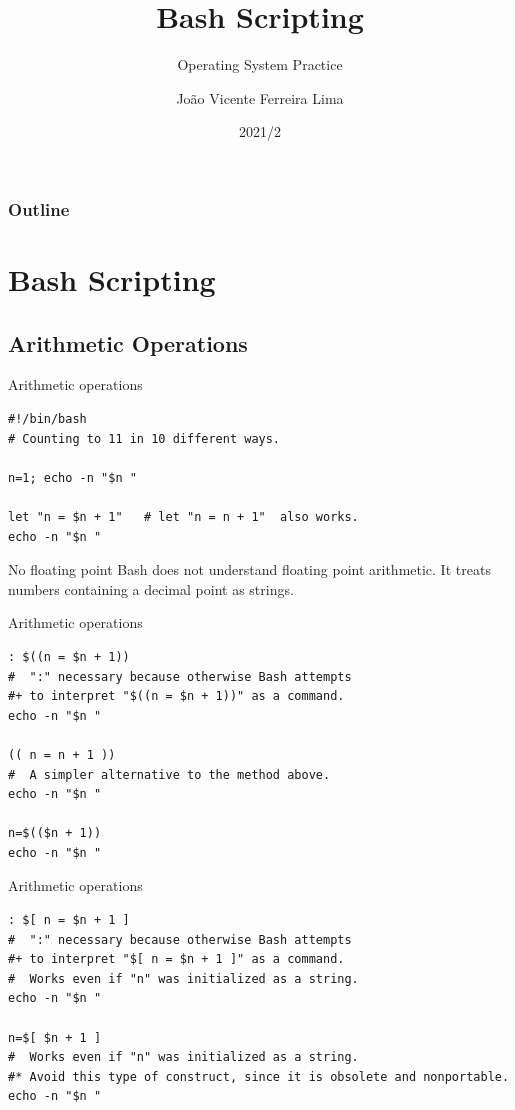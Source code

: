 \documentclass[xcolor=dvipsnames, 10pt, presentation,aspectratio=169]{beamer}
\author{João Vicente Ferreira Lima}
\date{2021/2}
\title{Bash Scripting}
\subtitle{Operating System Practice}
\institute[UFSM]{Universidade Federal de Santa Maria \\ \url{jvlima@inf.ufsm.br} \\ \url{http://www.inf.ufsm.br/~jvlima}}
\begin{document}
\maketitle
{}
{
  \frametitle{Outline}
  \tableofcontents
}

\makeatletter
{}
\makeatother

\section{Bash Scripting}
\label{sec:org39a313b}
\subsection{Arithmetic Operations}
\label{sec:org55f1e2f}
\begin{frame}[label={sec:org5d02e79},fragile]{Arithmetic operations}
 \begin{block}{}
\begin{verbatim}
#!/bin/bash
# Counting to 11 in 10 different ways.

n=1; echo -n "$n "

let "n = $n + 1"   # let "n = n + 1"  also works.
echo -n "$n "

\end{verbatim}
\end{block}
\pause
\begin{alertblock}{No floating point}
Bash does not understand floating point arithmetic. It treats numbers
containing a decimal point as strings.
\end{alertblock}
\end{frame}
\begin{frame}[label={sec:org715b9c8},fragile]{Arithmetic operations}
 \begin{block}{}
\begin{verbatim}
: $((n = $n + 1))
#  ":" necessary because otherwise Bash attempts
#+ to interpret "$((n = $n + 1))" as a command.
echo -n "$n "

(( n = n + 1 ))
#  A simpler alternative to the method above.
echo -n "$n "

n=$(($n + 1))
echo -n "$n "
\end{verbatim}
\end{block}
\end{frame}
\begin{frame}[label={sec:org6d51783},fragile]{Arithmetic operations}
 \begin{block}{}
\begin{verbatim}
: $[ n = $n + 1 ]
#  ":" necessary because otherwise Bash attempts
#+ to interpret "$[ n = $n + 1 ]" as a command.
#  Works even if "n" was initialized as a string.
echo -n "$n "

n=$[ $n + 1 ]
#  Works even if "n" was initialized as a string.
#* Avoid this type of construct, since it is obsolete and nonportable.
echo -n "$n "
\end{verbatim}
\end{block}
\end{frame}
\end{document}
